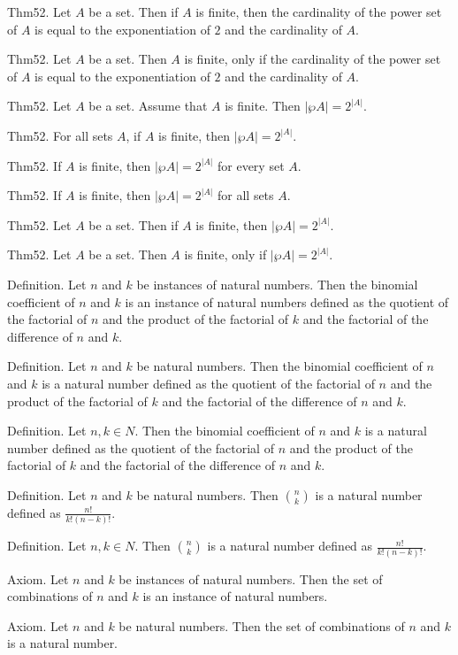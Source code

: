 \documentclass{article}
\begin{document}
Thm52. Let $A$ be a set. Then if $A$ is finite, then the cardinality of the power set of $A$ is equal to the exponentiation of $2$ and the cardinality of $A$.

Thm52. Let $A$ be a set. Then $A$ is finite, only if the cardinality of the power set of $A$ is equal to the exponentiation of $2$ and the cardinality of $A$.

Thm52. Let $A$ be a set. Assume that $A$ is finite. Then $| \wp A | = 2 ^ {| A |}$.

Thm52. For all sets $A$, if $A$ is finite, then $| \wp A | = 2 ^ {| A |}$.

Thm52. If $A$ is finite, then $| \wp A | = 2 ^ {| A |}$ for every set $A$.

Thm52. If $A$ is finite, then $| \wp A | = 2 ^ {| A |}$ for all sets $A$.

Thm52. Let $A$ be a set. Then if $A$ is finite, then $| \wp A | = 2 ^ {| A |}$.

Thm52. Let $A$ be a set. Then $A$ is finite, only if $| \wp A | = 2 ^ {| A |}$.

Definition. Let $n$ and $k$ be instances of natural numbers. Then the binomial coefficient of $n$ and $k$ is an instance of natural numbers defined as the quotient of the factorial of $n$ and the product of the factorial of $k$ and the factorial of the difference of $n$ and $k$.

Definition. Let $n$ and $k$ be natural numbers. Then the binomial coefficient of $n$ and $k$ is a natural number defined as the quotient of the factorial of $n$ and the product of the factorial of $k$ and the factorial of the difference of $n$ and $k$.

Definition. Let $n , k \in N$. Then the binomial coefficient of $n$ and $k$ is a natural number defined as the quotient of the factorial of $n$ and the product of the factorial of $k$ and the factorial of the difference of $n$ and $k$.

Definition. Let $n$ and $k$ be natural numbers. Then $\binom{ n }{ k}$ is a natural number defined as $\frac{ n !}{k ! (n - k)!}$.

Definition. Let $n , k \in N$. Then $\binom{ n }{ k}$ is a natural number defined as $\frac{ n !}{k ! (n - k)!}$.

Axiom. Let $n$ and $k$ be instances of natural numbers. Then the set of combinations of $n$ and $k$ is an instance of natural numbers.

Axiom. Let $n$ and $k$ be natural numbers. Then the set of combinations of $n$ and $k$ is a natural number.
\end{document}
